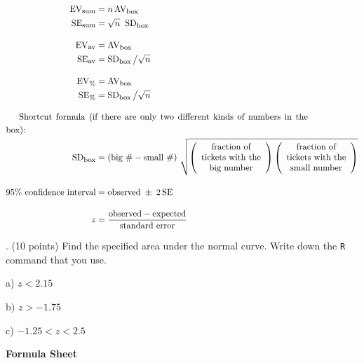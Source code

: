 \documentclass[10pt]{article}
\begin{document}
\begin{align*}
\mbox{EV}_{\mbox{\footnotesize sum}} & = n\,\mbox{AV}_{\mbox{\footnotesize box}}\\
\mbox{SE}_{\mbox{\footnotesize sum}} & = \sqrt{n}\;\;\mbox{SD}_{\mbox{\footnotesize box}}\\[10pt]
%
\mbox{EV}_{\mbox{\footnotesize av}} & = \mbox{AV}_{\mbox{\footnotesize box}}\\
\mbox{SE}_{\mbox{\footnotesize av}} & = \mbox{SD}_{\mbox{\footnotesize box}}\,\big{/}\sqrt{n}\\[10pt]
%
\mbox{EV}_{\mbox{\footnotesize \%}} & = \mbox{AV}_{\mbox{\footnotesize box}}\\
\mbox{SE}_{\mbox{\footnotesize \%}} & = \mbox{SD}_{\mbox{\footnotesize box}}\,\big{/}\sqrt{n}\\[10pt]
%
\noalign{Shortcut formula (if there are only two different kinds of numbers in the box):}
\mbox{SD}_{\mbox{\footnotesize box}} &=
  \left(\mbox{big \#} - \mbox{small \#}\right)\,\sqrt{
  \left(\begin{array}{c}\mbox{fraction of}\\ \mbox{tickets with the}\\ \mbox{big number}\end{array}\right)
  \left(\begin{array}{c}\mbox{fraction of}\\\mbox{tickets with the}\\\mbox{small number}\end{array}\right)}\\[10pt]
%
\mbox{95\% confidence interval} &= \mbox{observed} \;\pm\; 2\,\mbox{SE}\\[10pt]
z &= \frac{\mbox{observed} - \mbox{expected}}{\mbox{standard error}}
\end{align*}

\vfill
{}. (10 points) Find the specified area under the normal curve.  Write down the \texttt{R} command that you use.

\hspace{10pt} a) $z<2.15$ 
\bigskip
\bigskip\bigskip\bigskip

\hspace{10pt} b) $z>-1.75$
\bigskip
\bigskip\bigskip\bigskip

\hspace{10pt} c) $-1.25 < z < 2.5$
\vfill



\begin{center}
\textbf{\large Formula Sheet}
\end{center}
\end{document}
